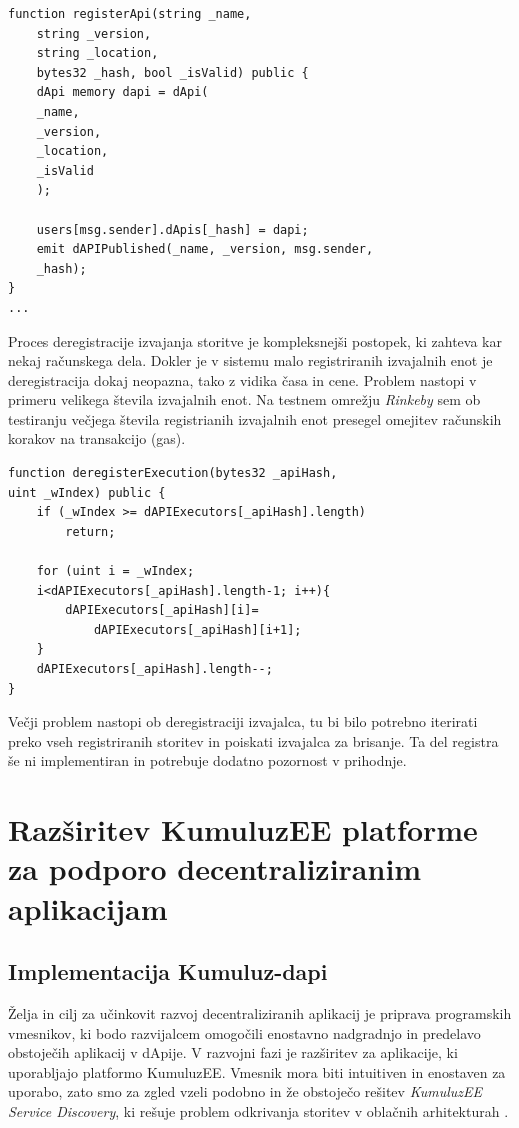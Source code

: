 \documentclass[a4paper, 12pt]{book}
\begin{document}
\begin{lstlisting}
function registerApi(string _name,
	string _version,
	string _location,
	bytes32 _hash, bool _isValid) public {
	dApi memory dapi = dApi(
	_name,
	_version,
	_location,
	_isValid
	);
	
	users[msg.sender].dApis[_hash] = dapi;
	emit dAPIPublished(_name, _version, msg.sender,
	_hash);
}
...
\end{lstlisting}

Proces deregistracije izvajanja storitve je kompleksnejši postopek, ki zahteva kar nekaj računskega dela.
Dokler je v sistemu malo registriranih izvajalnih enot je deregistracija dokaj neopazna, tako z vidika časa in cene.
Problem nastopi v primeru velikega števila izvajalnih enot.
Na testnem omrežju \textit{Rinkeby} sem ob testiranju večjega števila registrianih izvajalnih enot presegel omejitev računskih korakov na transakcijo (gas).

\begin{lstlisting}
function deregisterExecution(bytes32 _apiHash, 
uint _wIndex) public {
	if (_wIndex >= dAPIExecutors[_apiHash].length)
		return;
	
	for (uint i = _wIndex;
	i<dAPIExecutors[_apiHash].length-1; i++){
		dAPIExecutors[_apiHash][i]=
			dAPIExecutors[_apiHash][i+1];
	}
	dAPIExecutors[_apiHash].length--;
}
\end{lstlisting}

Večji problem nastopi ob deregistraciji izvajalca, tu bi bilo potrebno iterirati preko vseh registriranih storitev in poiskati izvajalca za brisanje.
Ta del registra še ni implementiran in potrebuje dodatno pozornost v prihodnje.


\section{Razširitev KumuluzEE platforme za podporo decentraliziranim aplikacijam}

\subsection{Implementacija Kumuluz-dapi}
Želja in cilj za učinkovit razvoj decentraliziranih aplikacij je priprava programskih vmesnikov, ki bodo razvijalcem omogočili enostavno nadgradnjo in predelavo obstoječih aplikacij v dApije.
V razvojni fazi je razširitev za aplikacije, ki uporabljajo platformo KumuluzEE.
Vmesnik mora biti intuitiven in enostaven za uporabo, zato smo za zgled vzeli podobno in že obstoječo rešitev \textit{KumuluzEE Service Discovery}, ki rešuje problem odkrivanja storitev v oblačnih arhitekturah \cite{maldip}.
\end{document}
